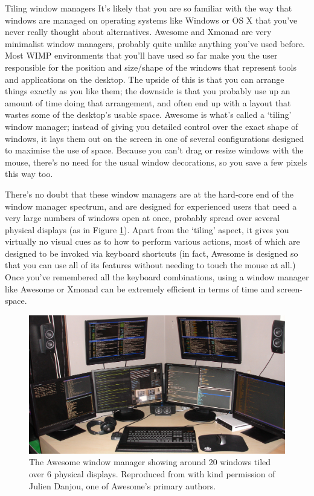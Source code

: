 \begin{diversion}{Tiling window managers}
It's likely that you are so familiar with the way that windows are managed on operating systems like Windows or OS X that you've never really thought about alternatives. 
Awesome and Xmonad are very minimalist window managers, probably quite unlike anything you've used before. Most WIMP environments that you'll have used so far make you the user responsible for the position and size/shape of the windows that represent tools and applications on the desktop. The upside of this is that you can arrange things exactly as you like them; the downside is that you probably use up an amount of time doing that arrangement, and often end up with a layout that wastes some of the desktop's usable space. Awesome is what's called a `tiling' window manager; instead of giving you detailed control over the exact shape of windows, it lays them out on the screen in one of several configurations designed to maximise the use of space. Because you can't drag or resize windows with the mouse, there's no need for the usual window decorations, so you save a few pixels this way too. 

There's no doubt that these window managers are at the hard-core end of the window manager spectrum, and are designed for experienced users that need a very large numbers of windows open at once, probably spread over several physical displays (as in Figure \ref{figure:awesome}). Apart from the `tiling' aspect, it gives you virtually no visual cues as to how to perform various actions, most of which are designed to be invoked via keyboard shortcuts (in fact, Awesome is designed so that you can use all of its features without needing to touch the mouse at all.) Once you've remembered all the keyboard combinations, using a window manager like Awesome or Xmonad can be extremely efficient in terms of time and screen-space.
\end{diversion}

\begin{figure}[htb]
  \begin{center}
    \includegraphics[width=14cm]{images/awesome.png}
  \end{center}
\caption{The Awesome window manager showing around 20 windows tiled over 6 physical displays. Reproduced from  with kind permission of Julien Danjou, one of Awesome's primary authors.}
\label{figure:awesome}
\end{figure}

